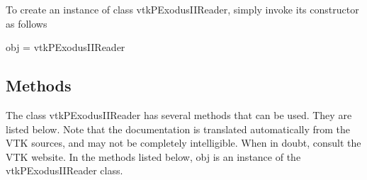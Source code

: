 To create an instance of class vtk\-P\-Exodus\-I\-I\-Reader, simply invoke its constructor as follows \begin{DoxyVerb}  obj = vtkPExodusIIReader
\end{DoxyVerb}
 \hypertarget{vtkwidgets_vtkxyplotwidget_Methods}{}\subsection{Methods}\label{vtkwidgets_vtkxyplotwidget_Methods}
The class vtk\-P\-Exodus\-I\-I\-Reader has several methods that can be used. They are listed below. Note that the documentation is translated automatically from the V\-T\-K sources, and may not be completely intelligible. When in doubt, consult the V\-T\-K website. In the methods listed below, {\ttfamily obj} is an instance of the vtk\-P\-Exodus\-I\-I\-Reader class. 
